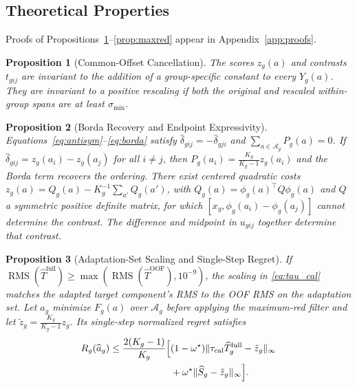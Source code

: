 \documentclass[letterpaper,journal]{IEEEtran}
\DeclareMathOperator{\RMS}{RMS}
\newtheorem{proposition}{Proposition}
\begin{document}
\subsection{Theoretical Properties}
Proofs of Propositions~\ref{prop:offset}--\ref{prop:maxred} appear in Appendix~\ref{app:proofs}.

\begin{proposition}[Common-Offset Cancellation]
\label{prop:offset}
The scores $z_g(a)$ and contrasts $t_{gij}$ are invariant to the addition of a group-specific constant to every $Y_g(a)$. They are invariant to a positive rescaling if both the original and rescaled within-group spans are at least $\sigma_{\min}$.
\end{proposition}

\begin{proposition}[Borda Recovery and Endpoint Expressivity]
\label{prop:expressivity}
Equations~\eqref{eq:antisym}--\eqref{eq:borda} satisfy $\widehat\delta_{gij}=-\widehat\delta_{gji}$ and $\sum_{a\in\mathcal{A}_g}P_g(a)=0$. If $\widehat\delta_{gij}=z_g(a_i)-z_g(a_j)$ for all $i\ne j$, then $P_g(a_i)=\frac{K_g}{K_g-1}z_g(a_i)$ and the Borda term recovers the ordering. There exist centered quadratic costs $z_g(a)=Q_g(a)-K_g^{-1}\sum_{a'}Q_g(a')$, with $Q_g(a)=\phi_g(a)^\top Q\phi_g(a)$ and $Q$ a symmetric positive definite matrix, for which $[x_g,\phi_g(a_i)-\phi_g(a_j)]$ cannot determine the contrast. The difference and midpoint in $u_{gij}$ together determine that contrast.
\end{proposition}

\begin{proposition}[Adaptation-Set Scaling and Single-Step Regret]
\label{prop:regret}
If $\RMS(\widehat T^{\mathrm{full}})\ge\max(\RMS(\widehat T^{\mathrm{OOF}}),10^{-9})$, the scaling in \eqref{eq:tau_cal} matches the adapted target component's RMS to the OOF RMS on the adaptation set. Let $\widehat a_g$ minimize $F_g(a)$ over $\mathcal{A}_g$ before applying the maximum-red filter and let $\tilde z_g=\frac{K_g}{K_g-1}z_g$. Its single-step normalized regret satisfies
\begin{equation}
\begin{split}
  R_g(\widehat a_g) \le \frac{2(K_g-1)}{K_g}\Bigl[&(1-\omega^\star)\|\tau_{\mathrm{cal}}\widehat T_g^{\mathrm{full}}-\tilde z_g\|_\infty\\
  &+\omega^\star\|\widehat S_g-\tilde z_g\|_\infty\Bigr].
\end{split}
  \label{eq:regret_bound}
\end{equation}
\end{proposition}
\end{document}

